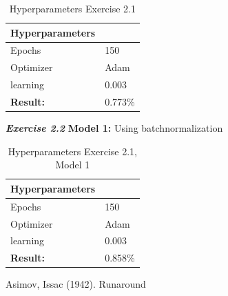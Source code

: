 \documentclass[a4paper,10pt]{article}
\begin{document}
\begin{table}[ht!]
\centering
\begin{tabular}{ll}\hline 
 \textbf{Hyperparameters}&    \\ \hline
 Epochs&  150 \\ 
 Optimizer& Adam  \\
 learning& 0.003 \\ \hline
\textbf{Result: }&   0.773\% \\ \hline
\end{tabular}
\caption{Hyperparameters Exercise 2.1}
\label{tab:tab8}
\end{table}

\textit{\textbf{Exercise 2.2}}
\textbf{Model 1: } Using batchnormalization 

\begin{table}[ht!]
\centering
\begin{tabular}{ll}\hline 
 \textbf{Hyperparameters}&    \\ \hline
 Epochs&  150 \\ 
 Optimizer& Adam  \\
 learning& 0.003 \\ \hline
\textbf{Result: }&   0.858\% \\ \hline
\end{tabular}
\caption{Hyperparameters Exercise 2.1, Model 1}
\label{tab:tab8}
\end{table}

\begin{thebibliography}{1}

 Asimov, Issac (1942). Runaround

\end{thebibliography}
\end{document}
